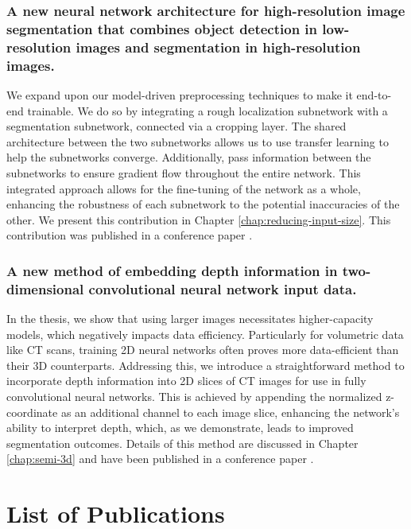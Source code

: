 \subsubsection{A new neural network architecture for high-resolution image segmentation that combines object detection in low-resolution images and segmentation in high-resolution images.}

We expand upon our model-driven preprocessing techniques to make it end-to-end trainable. We do so by integrating a rough localization subnetwork with a segmentation subnetwork, connected via a cropping layer. The shared architecture between the two subnetworks allows us to use transfer learning to help the subnetworks converge. Additionally, pass information between the subnetworks to ensure gradient flow throughout the entire network. This integrated approach allows for the fine-tuning of the network as a whole, enhancing the robustness of each subnetwork to the potential inaccuracies of the other. We present this contribution in Chapter \ref{chap:reducing-input-size}. This contribution was published in a conference paper \cite{bencevicCropGuidedNeuralNetwork2024}.

\subsubsection{A new method of embedding depth information in two-dimensional convolutional neural network input data.}

In the thesis, we show that using larger images necessitates higher-capacity models, which negatively impacts data efficiency. Particularly for volumetric data like CT scans, training 2D neural networks often proves more data-efficient than their 3D counterparts. Addressing this, we introduce a straightforward method to incorporate depth information into 2D slices of CT images for use in fully convolutional neural networks. This is achieved by appending the normalized z-coordinate as an additional channel to each image slice, enhancing the network's ability to interpret depth, which, as we demonstrate, leads to improved segmentation outcomes. Details of this method are discussed in Chapter \ref{chap:semi-3d} and have been published in a conference paper \cite{bencevicEpicardialAdiposeTissue2021}.

\section{List of Publications}

